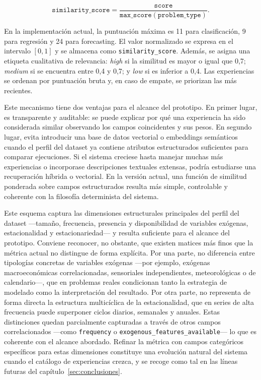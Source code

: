 \documentclass[12pt,a4paper]{article}
\theoremstyle{plain}
\begin{document}
\begin{equation*}
\mathtt{similarity\_score} = \frac{\mathtt{score}}{\mathtt{max\_score}(\mathtt{problem\_type})}.
\end{equation*}

En la implementación actual, la puntuación máxima es 11 para clasificación, 9 para regresión y 24 para forecasting. El valor normalizado se expresa en el intervalo $[0,1]$ y se almacena como \texttt{similarity\_score}. Además, se asigna una etiqueta cualitativa de relevancia: \textit{high} si la similitud es mayor o igual que 0,7; \textit{medium} si se encuentra entre 0,4 y 0,7; y \textit{low} si es inferior a 0,4. Las experiencias se ordenan por puntuación bruta y, en caso de empate, se priorizan las más recientes.

Este mecanismo tiene dos ventajas para el alcance del prototipo. En primer lugar, es transparente y auditable: se puede explicar por qué una experiencia ha sido considerada similar observando los campos coincidentes y sus pesos. En segundo lugar, evita introducir una base de datos vectorial o embeddings semánticos cuando el perfil del dataset ya contiene atributos estructurados suficientes para comparar ejecuciones. Si el sistema creciese hasta manejar muchas más experiencias o incorporase descripciones textuales extensas, podría estudiarse una recuperación híbrida o vectorial. En la versión actual, una función de similitud ponderada sobre campos estructurados resulta más simple, controlable y coherente con la filosofía determinista del sistema.

Este esquema captura las dimensiones estructurales principales del perfil del dataset ---tamaño, frecuencia, presencia y disponibilidad de variables exógenas, estacionalidad y estacionariedad--- y resulta suficiente para el alcance del prototipo. Conviene reconocer, no obstante, que existen matices más finos que la métrica actual no distingue de forma explícita. Por una parte, no diferencia entre tipologías concretas de variables exógenas ---por ejemplo, exógenas macroeconómicas correlacionadas, sensoriales independientes, meteorológicas o de calendario---, que en problemas reales condicionan tanto la estrategia de modelado como la interpretación del resultado. Por otra parte, no representa de forma directa la estructura multicíclica de la estacionalidad, que en series de alta frecuencia puede superponer ciclos diarios, semanales y anuales. Estas distinciones quedan parcialmente capturadas a través de otros campos correlacionados ---como \texttt{frequency} o \texttt{exogenous\_features\_available}--- lo que es coherente con el alcance abordado. Refinar la métrica con campos categóricos específicos para estas dimensiones constituye una evolución natural del sistema cuando el catálogo de experiencias crezca, y se recoge como tal en las líneas futuras del capítulo~\ref{sec:conclusiones}.
\end{document}
